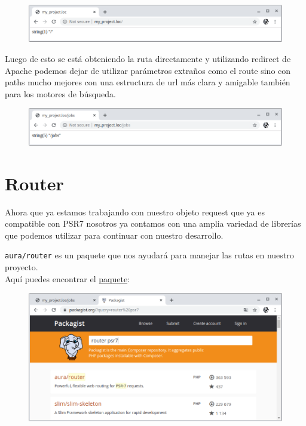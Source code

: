 \documentclass{article}
\begin{document}
\begin{figure}[h!]
  \centering
  \includegraphics[scale=0.5]{./Pictures/114_redirectApache.png}
\end{figure}

Luego de esto se está obteniendo la ruta directamente y utilizando redirect de
Apache podemos dejar de utilizar parámetros extraños como el route sino con
paths mucho mejores con una estructura de url más clara y amigable también para
los motores de búsqueda.\\

\begin{figure}[h!]
  \centering
  \includegraphics[scale=0.5]{./Pictures/115_redirectApache.png}
\end{figure}

\newpage

\section{Router}%
Ahora que ya estamos trabajando con nuestro objeto request que ya es compatible
con PSR7 nosotros ya contamos con una amplia variedad de librerías que podemos
utilizar para continuar con nuestro desarrollo.

\texttt{aura/router} es un paquete que nos ayudará para manejar las rutas en
nuestro proyecto.\\

Aquí puedes encontrar el
\href{https://packagist.org/packages/aura/router}{paquete}:\\

\begin{figure}[h!]
  \centering
  \includegraphics[scale=0.5]{./Pictures/116_router_psr7.png}
\end{figure}
\end{document}
